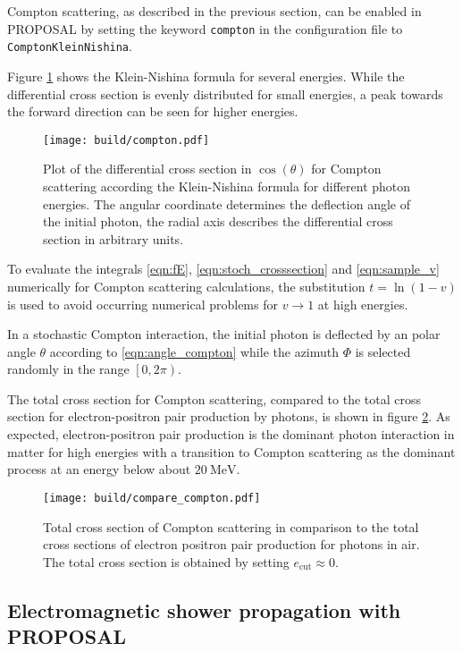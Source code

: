 \begin{sloppypar}
Compton scattering, as described in the previous section, can be enabled in PROPOSAL by setting the keyword \texttt{compton} in the configuration file to \texttt{ComptonKleinNishina}.
\end{sloppypar}
Figure \ref{fig:compton} shows the Klein-Nishina formula for several energies.
While the differential cross section is evenly distributed for small energies, a peak towards the forward direction can be seen for higher energies.

\begin{figure}
    \centering
    \texttt{[image: build/compton.pdf]}
    \caption{Plot of the differential cross section in $\cos(\theta)$ for Compton scattering according the Klein-Nishina formula for different photon energies. The angular coordinate determines the deflection angle of the initial photon, the radial axis describes the differential cross section in arbitrary units.}
    \label{fig:compton}
\end{figure}

To evaluate the integrals \eqref{eqn:fE}, \eqref{eqn:stoch_crosssection} and \eqref{eqn:sample_v} numerically for Compton scattering calculations, the substitution $t = \ln(1 - v)$ is used to avoid occurring numerical problems for $v \to 1$ at high energies.

In a stochastic Compton interaction, the initial photon is deflected by an polar angle $\theta$ according to \eqref{eqn:angle_compton} while the azimuth $\Phi$ is selected randomly in the range $\left[0,2\pi\right)$.

The total cross section for Compton scattering, compared to the total cross section for electron-positron pair production by photons, is shown in figure \ref{fig:compton_comparison}.
As expected, electron-positron pair production is the dominant photon interaction in matter for high energies with a transition to Compton scattering as the dominant process at an energy below about $\SI{20}{\mega\electronvolt}$.

\begin{figure}
    \centering
    \texttt{[image: build/compare\_compton.pdf]}
    \caption{Total cross section of Compton scattering in comparison to the total cross sections of electron positron pair production for photons in air. The total cross section is obtained by setting $e_\text{cut} \approx 0$.}
    \label{fig:compton_comparison}
\end{figure}

\subsection{Electromagnetic shower propagation with PROPOSAL}

